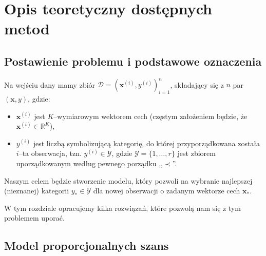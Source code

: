 \documentclass{mini}
\begin{document}
\chapter{Opis teoretyczny dostępnych metod}


\section{Postawienie problemu i podstawowe oznaczenia}

Na wejściu dany mamy zbiór $\mathcal{D} = (\mathbf{x}^{(i)}, y^{(i)})_{i=1}^n$, składający się z $n$ par $(\mathbf{x}, y)$, gdzie:
\begin{itemize}
\item $\mathbf{x}^{(i)}$ jest $K$--wymiarowym wektorem cech (częstym założeniem będzie, że $\mathbf{x}^{(i)}\in \mathbb{R}^K$),  
\item $y^{(i)}$ jest liczbą symbolizującą kategorię, do której przyporządkowana została $i$--ta obserwacja, tzn. $y^{(i)}\in\mathcal{Y}$, gdzie $\mathcal{Y} = \lbrace 1,\ldots ,r \rbrace$ jest zbiorem uporządkowanym według pewnego porządku ,,$\prec$''. 
\end{itemize}
Naszym celem będzie stworzenie modelu, który pozwoli na wybranie najlepszej (nieznanej) kategorii $y_{\ast}\in\mathcal{Y}$ dla nowej obserwacji o zadanym wektorze cech $\mathbf{x}_{\ast}$. 

W tym rozdziale opracujemy kilka rozwiązań, które pozwolą nam się z tym problemem uporać.

\section{Model proporcjonalnych szans}
\end{document}
